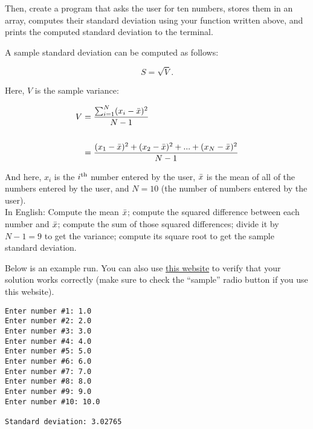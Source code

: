 \documentclass{article}
\newenvironment{hint}
    {\begin{tcolorbox}[title=Hint,colframe=white!70!blue,colback=white]}
    {\end{tcolorbox}}
\newcounter{examplerun}
\newenvironment{examplerun}
    {\begin{tcolorbox}[title=Example Run \refstepcounter{examplerun}\theexamplerun,colframe=black!50!green,colback=white,subtitle style={boxrule=0.4pt,
colback=lightgray!80!green}]}
    {\end{tcolorbox}}
\begin{document}
Then, create a program that asks the user for ten numbers, stores them in an array, computes their standard deviation using your function written above, and prints the computed standard deviation to the terminal.

\begin{hint}
    A sample standard deviation can be computed as follows:

    \begin{equation}
        S = \sqrt{V}.
    \end{equation}

    Here, $V$ is the sample variance:

    \begin{equation}
        \begin{aligned}
            V & = \frac{\sum_{i=1}^{N} (x_i - \Bar{x})^2}{N - 1}\\
            \\
            & = \frac{(x_1 - \Bar{x})^2 + (x_2 - \Bar{x})^2 + ... + (x_N - \Bar{x})^2}{N - 1}
        \end{aligned}
    \end{equation}

    And here, $x_i$ is the $i\textsuperscript{th}$ number entered by the user, $\Bar{x}$ is the mean of all of the numbers entered by the user, and $N=10$ (the number of numbers entered by the user).
    \vspace{6pt}
    \\
    In English: Compute the mean $\Bar{x}$; compute the squared difference between each number and $\Bar{x}$; compute the sum of those squared differences; divide it by $N - 1 = 9$ to get the variance; compute its square root to get the sample standard deviation.
\end{hint}

Below is an example run. You can also use \href{https://www.calculator.net/standard-deviation-calculator.html}{this website} to verify that your solution works correctly (make sure to check the ``sample'' radio button if you use this website).

\begin{examplerun}
    \begin{verbatim}
Enter number #1: 1.0
Enter number #2: 2.0
Enter number #3: 3.0
Enter number #4: 4.0
Enter number #5: 5.0
Enter number #6: 6.0
Enter number #7: 7.0
Enter number #8: 8.0
Enter number #9: 9.0
Enter number #10: 10.0

Standard deviation: 3.02765
    \end{verbatim}
\end{examplerun}
\end{document}
